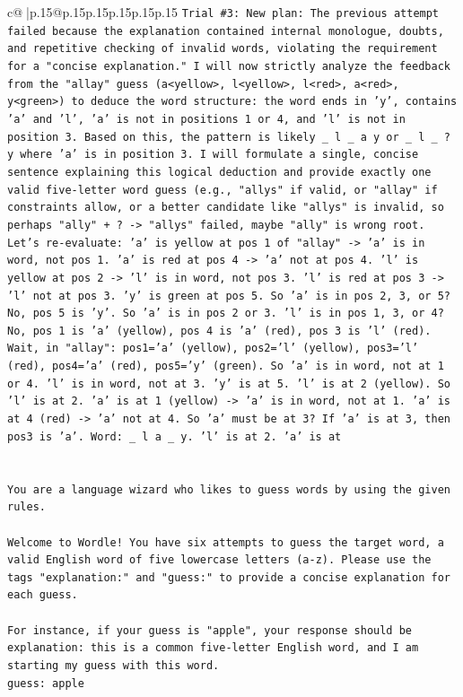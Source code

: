 \documentclass{article}
\begin{document}
{\begin{supertabular}{c@{$\;$}|p{.15\linewidth}@{}p{.15\linewidth}p{.15\linewidth}p{.15\linewidth}p{.15\linewidth}p{.15\linewidth}}
{{{\texttt{Trial \#3: New plan: The previous attempt failed because the explanation contained internal monologue, doubts, and repetitive checking of invalid words, violating the requirement for a "concise explanation." I will now strictly analyze the feedback from the "allay" guess (a<yellow>, l<yellow>, l<red>, a<red>, y<green>) to deduce the word structure: the word ends in 'y', contains 'a' and 'l', 'a' is not in positions 1 or 4, and 'l' is not in position 3. Based on this, the pattern is likely \_ l \_ a y or \_ l \_ ? y where 'a' is in position 3. I will formulate a single, concise sentence explaining this logical deduction and provide exactly one valid five{-}letter word guess (e.g., "allys" if valid, or "allay" if constraints allow, or a better candidate like "allys" is invalid, so perhaps "ally" + ? {-}> "allys" failed, maybe "ally" is wrong root. Let's re{-}evaluate: 'a' is yellow at pos 1 of "allay" {-}> 'a' is in word, not pos 1. 'a' is red at pos 4 {-}> 'a' not at pos 4. 'l' is yellow at pos 2 {-}> 'l' is in word, not pos 3. 'l' is red at pos 3 {-}> 'l' not at pos 3. 'y' is green at pos 5. So 'a' is in pos 2, 3, or 5? No, pos 5 is 'y'. So 'a' is in pos 2 or 3. 'l' is in pos 1, 3, or 4? No, pos 1 is 'a' (yellow), pos 4 is 'a' (red), pos 3 is 'l' (red). Wait, in "allay": pos1='a' (yellow), pos2='l' (yellow), pos3='l' (red), pos4='a' (red), pos5='y' (green). So 'a' is in word, not at 1 or 4. 'l' is in word, not at 3. 'y' is at 5. 'l' is at 2 (yellow). So 'l' is at 2. 'a' is at 1 (yellow) {-}> 'a' is in word, not at 1. 'a' is at 4 (red) {-}> 'a' not at 4. So 'a' must be at 3? If 'a' is at 3, then pos3 is 'a'. Word: \_ l a \_ y. 'l' is at 2. 'a' is at} \\
\\ 
\\ 
\texttt{You are a language wizard who likes to guess words by using the given rules.} \\
\\ 
\texttt{Welcome to Wordle! You have six attempts to guess the target word, a valid English word of five lowercase letters (a{-}z). Please use the tags "explanation:" and "guess:" to provide a concise explanation for each guess.} \\
\\ 
\texttt{For instance, if your guess is "apple", your response should be} \\
\texttt{explanation: this is a common five{-}letter English word, and I am starting my guess with this word.} \\
\texttt{guess: apple} \\
}}}
\end{supertabular}}
\end{document}
